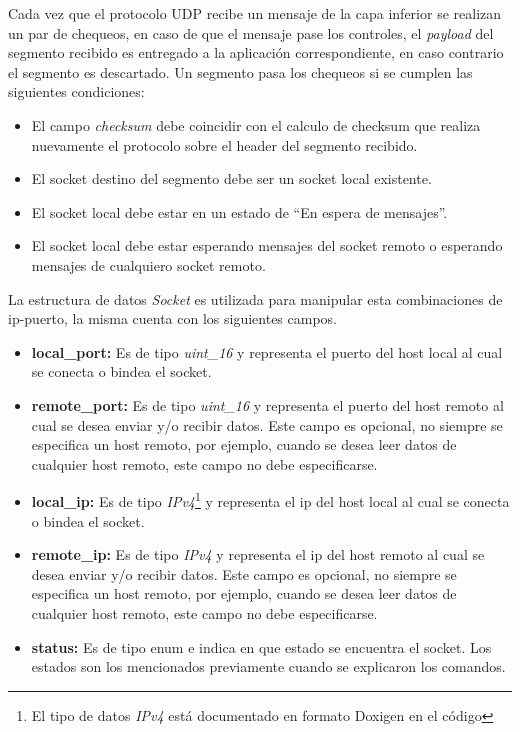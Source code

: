 \documentclass[10pt,a4paper]{article}
\begin{document}
Cada vez que el protocolo UDP recibe un mensaje de la capa inferior se realizan un par de chequeos, en caso de que el mensaje pase los controles, el \textit{payload} del segmento recibido es entregado a la aplicación correspondiente, en caso contrario el segmento es descartado. Un segmento pasa los chequeos si se cumplen las siguientes condiciones:

\begin{itemize}
\item El campo \textit{checksum} debe coincidir con el calculo de checksum que realiza nuevamente el protocolo sobre el header del segmento recibido.
\item El socket destino del segmento debe ser un socket local existente.
\item El socket local debe estar en un estado de ``En espera de mensajes''.
\item El socket local debe estar esperando mensajes del socket remoto o esperando mensajes de cualquiero socket remoto.
\end{itemize}

La estructura de datos \textit{Socket} es utilizada para manipular esta combinaciones de ip-puerto, la misma cuenta con los siguientes campos.

\begin{itemize}
\item \textbf{local\_port: } Es de tipo \textit{uint\_16} y representa el puerto del host local al cual se conecta o bindea el socket.
\item \textbf{remote\_port: } Es de tipo \textit{uint\_16} y representa el puerto del host remoto al cual se desea enviar y/o recibir datos. Este campo es opcional, no siempre se especifica un host remoto, por ejemplo, cuando se desea leer datos de cualquier host remoto, este campo no debe especificarse.
\item \textbf{local\_ip: } Es de tipo \textit{IPv4}\footnote{El tipo de datos \textit{IPv4} está documentado en formato Doxigen en el código} y representa el ip del host local al cual se conecta o bindea el socket.
\item \textbf{remote\_ip: } Es de tipo \textit{IPv4} y representa el ip del host remoto al cual se desea enviar y/o recibir datos. Este campo es opcional, no siempre se especifica un host remoto, por ejemplo, cuando se desea leer datos de cualquier host remoto, este campo no debe especificarse.
\item \textbf{status: } Es de tipo enum e indica en que estado se encuentra el socket. Los estados son los mencionados previamente cuando se explicaron los comandos.
\end{itemize}
\end{document}
